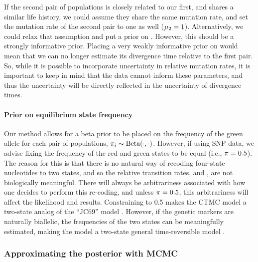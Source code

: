If the second pair of populations is closely related to our first, and shares a
similar life history, we could assume they share the same mutation rate, and
set the mutation rate of the second pair to one as well ($\murate[2] = 1$).
Alternatively, we could relax that assumption and put a prior on \murate[2].
However, this should be a strongly informative prior.
Placing a very weakly informative prior on \murate[2] would mean that we can no
longer estimate its divergence time relative to the first pair.
So, while it is possible to incorporate uncertainty in relative mutation rates,
it is important to keep in mind that the data cannot inform these parameters,
and thus the uncertainty will be directly reflected in the uncertainty of
divergence times.

\paragraph{Prior on equilibrium state frequency}
Our method allows for a beta prior to be placed on the frequency of the green
allele for each pair of populations,
$\gfreq[i] \sim \textrm{Beta}(\cdot, \cdot)$.
However, if using SNP data, we advise fixing the frequency of the red and green
states to be equal (i.e., $\gfreq = 0.5$).
The reason for this is that there is no natural way of recoding four-state
nucleotides to two states, and so the relative transition rates, \rgmurate and
\grmurate, are not biologically meaningful.
There will always be arbitrariness associated with how one decides to perform
this re-coding, and unless $\gfreq = 0.5$, this arbitrariness will affect the
likelihood and results.
Constraining \gfreq to 0.5 makes the CTMC model a two-state analog of the
``JC69'' model \citep{JC1969}.
However, if the genetic markers are naturally biallelic, the frequencies of the
two states can be meaningfully estimated, making the model a two-state general
time-reversible model \citep{Tavare1986}.

\subsubsection{Approximating the posterior with MCMC}

